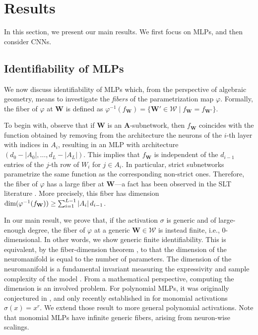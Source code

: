 \documentclass{article} %
\theoremstyle{plain}%
\theoremstyle{definition}
\theoremstyle{remark}
\begin{document}
\section{Results}\label{sec:res}
In this section, we present our main results. We first focus on MLPs, and then consider CNNs. 

\subsection{Identifiability of MLPs}\label{sec:dims}
We now discuss identifiability of MLPs which, from the perspective of algebraic geometry, means to %
investigate the \emph{fibers} of the parametrization map $\varphi$. Formally, 
the fiber of $\varphi$ at $\mathbf{W}$ is defined as $\varphi^{-1}(f_\mathbf{W}) = \{\mathbf{W}' \in \mathcal{W} \mid f_\mathbf{W} = f_{\mathbf{W}'} \}$. 

To begin with, observe that if $\mathbf{W}$ is an $\mathbf{A}$-subnetwork, then  $f_\mathbf{W}$ coincides with the function obtained by removing from the architecture the neurons of the $i$-th layer with indices in $A_i$, resulting in an MLP with architecture $(d_0 - |A_0|, \ldots, d_L - |A_L|)$. This implies that $f_\mathbf{W}$ is independent of the $d_{i-1}$ entries of the $j$-th row of $W_i$ for $j \in A_i$. In particular, strict subnetworks parametrize the same function as the corresponding non-strict ones. Therefore, the fiber of $\varphi$ has a large fiber at $\mathbf{W}$---a fact has been observed in the SLT literature \citep{amari2006singularities, wei2008dynamics, orhan2018skip}.  More precisely, this fiber has dimension $\textnormal{dim}(\varphi^{-1}(f_\mathbf{W})) \geq \sum_{i=1}^{L-1} |A_i|\,d_{i-1}$. 


In our main result, we prove that, if the activation $\sigma$ is generic and of large-enough degree, the fiber of $\varphi$ at a generic $\mathbf{W} \in \mathcal{W}$  is instead finite, i.e., $0$-dimensional. In other words, we show generic finite identifiability. This is equivalent, by the fiber-dimension theorem \cite[Chap. 1.6.3]{shafarevich}, to that the dimension of the neuromanifold is equal to the number of parameters.
The dimension of the neuromanifold is a fundamental invariant measuring the expressivity and sample complexity of the model \citep{kileel2019expressive, marchetti2025invitationneuroalgebraicgeometry}. From a mathematical perspective, computing the dimension is an involved problem. For polynomial MLPs, it was originally conjectured in \citep{kileel2019expressive}, and only recently established in \citep{finkel2024activation, usevich2025identifiability} for monomial activations $\sigma(x) = x^r$. We extend those result to more general polynomial activations. Note that monomial MLPs have infinite generic fibers, arising from neuron-wise scalings.
\end{document}

